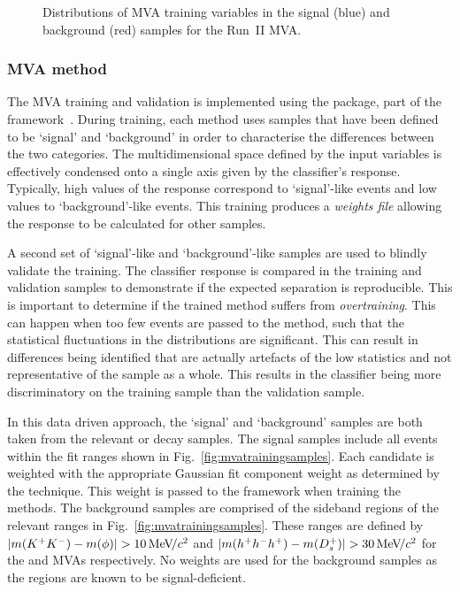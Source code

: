 \begin{figure}[!h]
\begin{subfigure}[t]{0.22\textwidth}
   \end{subfigure}
   \caption{Distributions of MVA training variables in the signal (blue) and background (red) samples for the Run~II \decay{\Dsp}{\Kp\Km\pip} MVA.}
   \label{fig:mvatrainingvariables_Ds}   
\end{figure}


\subsubsection{MVA method}
\label{sec:mvamethod}

The MVA training and validation is implemented using the \tmva package, part of the \root framework~\cite{BRUN199781}.
During training, each method uses samples that have been defined to be `signal' and `background' in order to characterise the differences between the two categories. The multidimensional space defined by the input variables is effectively condensed onto a single axis given by the classifier's response. Typically, high values of the response correspond to `signal'-like events and low values to `background'-like events. This training produces a \emph{weights file} allowing the response to be calculated for other samples. 

A second set of `signal'-like and `background'-like samples are used to blindly validate the training. The classifier response is compared in the training and validation samples to demonstrate if the expected separation is reproducible. 
This is important to determine if the trained method suffers from \emph{overtraining}. This can happen when too few events are passed to the method, such that the statistical fluctuations in the distributions are significant. This can result in differences being identified that are actually artefacts of the low statistics and not representative of the sample as a whole. This results in the classifier being more discriminatory on the training sample than the validation sample.

In this data  driven approach, the `signal' and `background' samples are both taken from the relevant \decay{\Bsb}{\Dsp\pim} or \decay{\Bs}{\jpsi\phiz} decay samples.
The signal samples include all events within the fit ranges shown in Fig.~\ref{fig:mvatrainingsamples}. Each candidate is weighted with the appropriate Gaussian fit component weight as determined by the \sPlot technique. This weight is passed to the \tmva framework when training the methods.
The background samples are comprised of the sideband regions of the relevant ranges in Fig.~\ref{fig:mvatrainingsamples}. These ranges are defined by $|m({{K}^+}{{K}^-})-m(\phi)| > 10 {\mathrm{\,Me\kern -0.1em V\!/}c^2}$ and $|m(h^{+}h^{-}h^{+})-m({{D}^+_{s}})| > 30{\mathrm{\,Me\kern -0.1em V\!/}c^2}$ for the \phiz and \Dsp MVAs respectively. No weights are used for the background samples as the regions are known to be signal-deficient.



